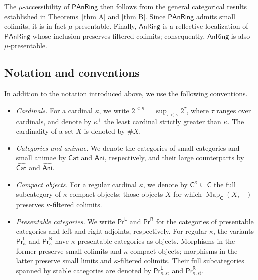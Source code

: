 The $\mu$-accessibility of $\mathsf{PAnRing}$ then follows from the general categorical results established in Theorems~\ref{thm A} and \ref{thm B}. Since $\mathsf{PAnRing}$ admits small colimits, it is in fact $\mu$-presentable. Finally, $\mathsf{AnRing}$ is a reflective localization of $\mathsf{PAnRing}$ whose inclusion preserves filtered colimits; consequently, $\mathsf{AnRing}$ is also $\mu$-presentable.

\subsection*{Notation and conventions}

In addition to the notation introduced above, we use the following conventions.
\begin{itemize}[leftmargin=*, itemsep=0.5\baselineskip, topsep=0.5\baselineskip, parsep=0pt, before={}]
    \item \emph{Cardinals.} For a cardinal $\kappa$, we write $2^{<\kappa}=\sup_{\tau<\kappa}2^\tau$, where $\tau$ ranges over cardinals, and denote by $\kappa^+$ the least cardinal strictly greater than $\kappa$. The cardinality of a set $X$ is denoted by $\# X$.

    \item \emph{Categories and animae.} We denote the categories of small categories and small animae by $\mathsf{Cat}$ and $\mathsf{Ani}$, respectively, and their large counterparts by $\widehat{\mathsf{Cat}}$ and $\widehat{\mathsf{Ani}}$.

    \item \emph{Compact objects.} For a regular cardinal $\kappa$, we denote by $\mathsf{C}^\kappa\subseteq\mathsf{C}$ the full subcategory of $\kappa$-compact objects: those objects $X$ for which $\operatorname{Map}_{\mathsf{C}}(X,-)$ preserves $\kappa$-filtered colimits.

    \item \emph{Presentable categories.} We write $\mathsf{Pr}^{\mathsf{L}}$ and $\mathsf{Pr}^{\mathsf{R}}$ for the categories of presentable categories and left and right adjoints, respectively. For regular $\kappa$, the variants $\mathsf{Pr}^{\mathsf{L}}_\kappa$ and $\mathsf{Pr}^{\mathsf{R}}_\kappa$ have $\kappa$-presentable categories as objects. Morphisms in the former preserve small colimits and $\kappa$-compact objects; morphisms in the latter preserve small limits and $\kappa$-filtered colimits. Their full subcategories spanned by stable categories are denoted by $\mathsf{Pr}^{\mathsf{L}}_{\kappa,\mathrm{st}}$ and $\mathsf{Pr}^{\mathsf{R}}_{\kappa,\mathrm{st}}$.


\end{itemize}
